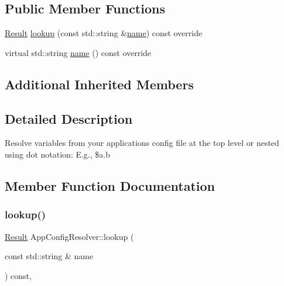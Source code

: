 \subsection*{Public Member Functions}
\begin{DoxyCompactItemize}
\item 
\hyperlink{classtheoria_1_1config_1_1ConfigVariableResolver_af27a85262d802c9ad4ecb1179efaf447}{Result} \hyperlink{classtheoria_1_1core_1_1AppConfigResolver_a7922df9559e63ccd91db5177224823fc}{lookup} (const std\+::string \&\hyperlink{classtheoria_1_1core_1_1AppConfigResolver_ad7c8c08e622613c6505418774a71abda}{name}) const override
\item 
virtual std\+::string \hyperlink{classtheoria_1_1core_1_1AppConfigResolver_ad7c8c08e622613c6505418774a71abda}{name} () const override
\end{DoxyCompactItemize}
\subsection*{Additional Inherited Members}


\subsection{Detailed Description}
Resolve variables from your application\textquotesingle{}s config file at the top level or nested using dot notation\+: E.\+g., \$a.\+b 

\subsection{Member Function Documentation}
\mbox{\label{classtheoria_1_1core_1_1AppConfigResolver_a7922df9559e63ccd91db5177224823fc}} 
\subsubsection{\texorpdfstring{lookup()}{lookup()}}
{\footnotesize\ttfamily \hyperlink{classtheoria_1_1config_1_1ConfigVariableResolver_af27a85262d802c9ad4ecb1179efaf447}{Result} App\+Config\+Resolver\+::lookup (\begin{DoxyParamCaption}\item[{const std\+::string \&}]{name }\end{DoxyParamCaption}) const\hspace{0.3cm}{\ttfamily [override]}, {\ttfamily [virtual]}}

